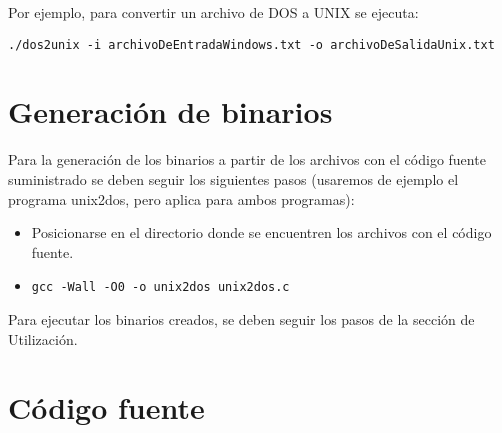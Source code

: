 \documentclass[a4paper,11pt]{article}
\begin{document}
\indent	
Por ejemplo, para convertir un archivo de DOS a UNIX se ejecuta: 

\begin{verbatim}
./dos2unix -i archivoDeEntradaWindows.txt -o archivoDeSalidaUnix.txt
\end{verbatim}

\section{Generaci\'on de binarios}
Para la generaci\'on de los binarios a partir de los archivos con el c\'odigo fuente suministrado se deben seguir los siguientes pasos (usaremos de ejemplo el programa unix2dos, pero aplica para ambos programas):

\begin{itemize}
\item Posicionarse en el directorio donde se encuentren los archivos con el c\'odigo fuente.
\item \begin{verbatim}
gcc -Wall -O0 -o unix2dos unix2dos.c
\end{verbatim} 
\end{itemize}

Para ejecutar los binarios creados, se deben seguir los pasos de la secci\'on de Utilizaci\'on.

\section{C\'odigo fuente}
\end{document}
